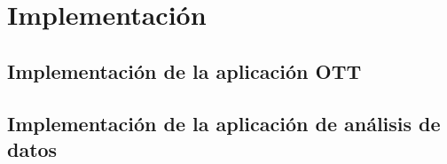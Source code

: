 \chapter{Implementación}
\label{sec:implementacion}



\section{Implementación de la aplicación OTT}



\section{Implementación de la aplicación de análisis de datos}


